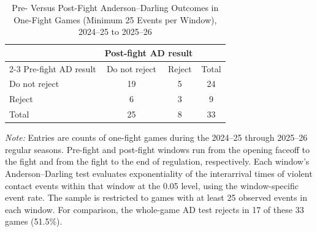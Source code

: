 \begin{table}[htbp]
\centering
\caption{Pre- Versus Post-Fight Anderson--Darling Outcomes in One-Fight Games (Minimum 25 Events per Window), 2024--25 to 2025--26}
\label{tab:one_fight_AD_rejection_min_25_20242025_20252026}
\small
\renewcommand{\arraystretch}{1.15}
\setlength{\tabcolsep}{6pt}

\begin{tabular*}{0.78\textwidth}{@{\extracolsep{\fill}}lccc}
\toprule
 & \multicolumn{2}{c}{Post-fight AD result} & \\
\cmidrule(lr){2-3}
Pre-fight AD result & Do not reject & Reject & Total \\
\midrule
Do not reject & 19 & 5 & 24 \\
Reject & 6 & 3 & 9 \\
\midrule
Total & 25 & 8 & 33 \\
\bottomrule
\end{tabular*}

\vspace{0.4em}
\parbox{0.78\textwidth}{
\footnotesize
\textit{Note:} Entries are counts of one-fight games during the 2024--25 through 2025--26 regular seasons. Pre-fight and post-fight windows run from the opening faceoff to the fight and from the fight to the end of regulation, respectively. Each window's Anderson--Darling test evaluates exponentiality of the interarrival times of violent contact events within that window at the 0.05 level, using the window-specific event rate. The sample is restricted to games with at least 25 observed events in each window. For comparison, the whole-game AD test rejects in 17 of these 33 games (51.5\%).
}
\end{table}
